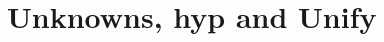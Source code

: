 \documentclass[11pt]{book}
\begin{document}
%



%


%


%


%

\chapter{Unknowns, hyp and Unify}
\label{chap:unknowns}
\end{document}
